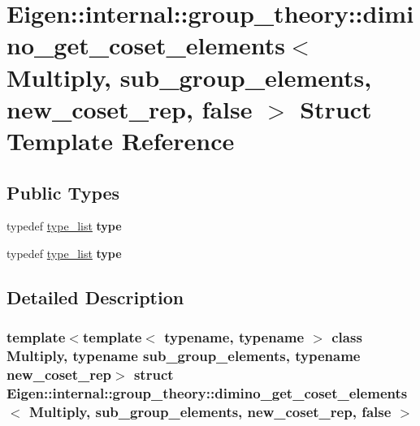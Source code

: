 \hypertarget{struct_eigen_1_1internal_1_1group__theory_1_1dimino__get__coset__elements_3_01_multiply_00_01sub6a817ae4e5806a51bb78ea524863d341}{}\section{Eigen\+:\+:internal\+:\+:group\+\_\+theory\+:\+:dimino\+\_\+get\+\_\+coset\+\_\+elements$<$ Multiply, sub\+\_\+group\+\_\+elements, new\+\_\+coset\+\_\+rep, false $>$ Struct Template Reference}
\label{struct_eigen_1_1internal_1_1group__theory_1_1dimino__get__coset__elements_3_01_multiply_00_01sub6a817ae4e5806a51bb78ea524863d341}
\subsection*{Public Types}
\begin{DoxyCompactItemize}
\item 
\mbox{\label{struct_eigen_1_1internal_1_1group__theory_1_1dimino__get__coset__elements_3_01_multiply_00_01sub6a817ae4e5806a51bb78ea524863d341_a52dff4181bccb385044a19c7fcb0b8e3}} 
typedef \hyperlink{struct_eigen_1_1internal_1_1type__list}{type\+\_\+list} {\bfseries type}
\item 
\mbox{\label{struct_eigen_1_1internal_1_1group__theory_1_1dimino__get__coset__elements_3_01_multiply_00_01sub6a817ae4e5806a51bb78ea524863d341_a52dff4181bccb385044a19c7fcb0b8e3}} 
typedef \hyperlink{struct_eigen_1_1internal_1_1type__list}{type\+\_\+list} {\bfseries type}
\end{DoxyCompactItemize}


\subsection{Detailed Description}
\subsubsection*{template$<$template$<$ typename, typename $>$ class Multiply, typename sub\+\_\+group\+\_\+elements, typename new\+\_\+coset\+\_\+rep$>$\newline
struct Eigen\+::internal\+::group\+\_\+theory\+::dimino\+\_\+get\+\_\+coset\+\_\+elements$<$ Multiply, sub\+\_\+group\+\_\+elements, new\+\_\+coset\+\_\+rep, false $>$}



